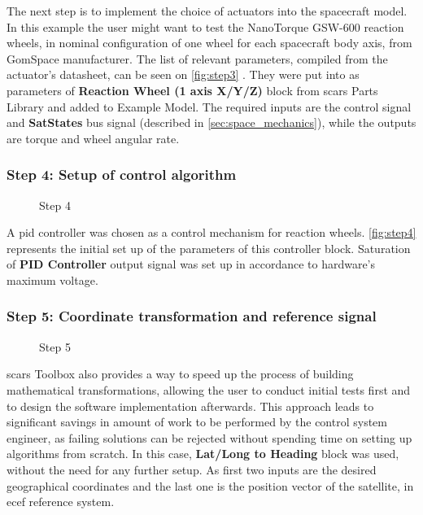             The next step is to implement the choice of actuators into the spacecraft model. In this example the user might want to test the NanoTorque GSW-600 reaction wheels, in nominal configuration of one wheel for each spacecraft body axis, from GomSpace manufacturer. The list of relevant parameters, compiled from the actuator's datasheet, can be seen on \autoref{fig:step3} . They were put into as parameters of \textbf{Reaction Wheel (1 axis X/Y/Z)} block from \ac{scars} Parts Library and added to Example Model. The required inputs are the control signal and \textbf{SatStates} bus signal (described in \autoref{sec:space_mechanics}), while the outputs are torque and wheel angular rate.

        
        \subsubsection*{Step 4: Setup of control algorithm}
            \begin{figure}[H]
                \centering
                \qquad
                \caption{Step 4}%
                \label{fig:step4}%
            \end{figure}
            A \ac{pid} controller was chosen as a control mechanism for reaction wheels. \autoref{fig:step4}  represents the initial set up of the parameters of this controller block. Saturation of \textbf{PID Controller} output signal was set up in accordance to hardware's maximum voltage.

        \subsubsection*{Step 5: Coordinate transformation and reference signal}
            \begin{figure}[H]
                \centering
                \caption{Step 5}%
                \label{fig:step5}%
            \end{figure}
            \ac{scars} Toolbox also provides a way to speed up the process of building mathematical transformations, allowing the user to conduct initial tests first and to design the software implementation afterwards. This approach leads to significant savings in amount of work to be performed by the control system engineer, as failing solutions can be rejected without spending time on setting up algorithms from scratch. In this case, \textbf{Lat/Long to Heading} block was used, without the need for any further setup. As first two inputs are the desired geographical coordinates and the last one is the position vector of the satellite, in \ac{ecef} reference system.

